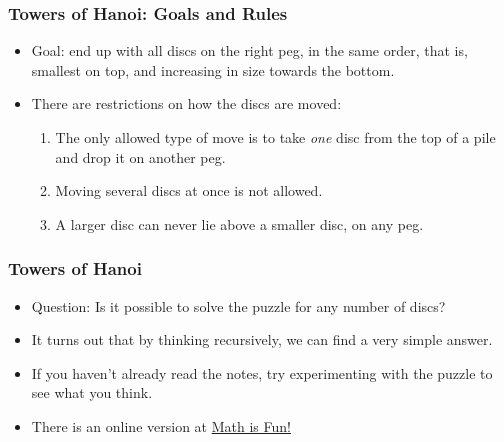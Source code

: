  \begin{frame}
\frametitle{Towers of Hanoi: Goals and Rules}

\begin{itemize}[<+->]
\item Goal: end up with all discs on the right peg, in the same order, that is, smallest on top, and increasing in size towards the bottom.

\item There are restrictions on how the discs are moved:
\begin{enumerate}
\item The only allowed type of move is to take \emph{one} disc from
  the top of a pile and drop it on another peg. 
  \item Moving several discs at once is not allowed.
\item A larger disc can never lie above a smaller disc, on any peg.
\end{enumerate}

\end{itemize} 
\end{frame}

 \begin{frame}
\frametitle{Towers of Hanoi}

\begin{itemize}[<+->]
\item 
Question: Is it possible to solve the puzzle for any number of discs?

\item It turns out that by thinking recursively, we can find a very simple answer.

\item If you haven't already read the notes, try experimenting with the puzzle to see what you think.


\item There is an online version at \href{https://www.mathsisfun.com/games/towerofhanoi.html}{Math is Fun!}


\end{itemize} 
\end{frame}





\iffalse 




